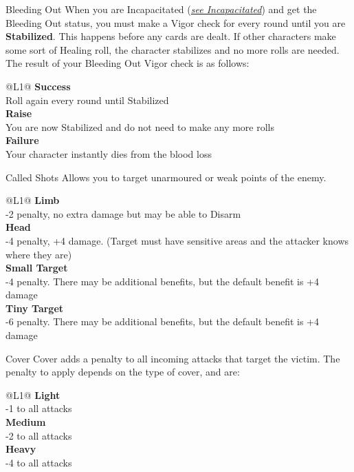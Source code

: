 \begin{genericsection}{Bleeding Out}
When you are Incapacitated (\textit{\hyperref[sec:rules-concepts-incapacitated]{see Incapacitated}}) and get the Bleeding Out status, you must make a Vigor check for every round until you are \textbf{Stabilized}. This happens before any cards are dealt. If other characters make some sort of Healing roll, the character stabilizes and no more rolls are needed. The result of your Bleeding Out Vigor check is as follows:
\begin{redtable}{\linewidth}{@{}L{1}@{}}
  \textbf{Success} \\
  Roll again every round until Stabilized\\
  \textbf{Raise} \\
  You are now Stabilized and do not need to make any more rolls\\
  \textbf{Failure} \\
  Your character instantly dies from the blood loss\\
\end{redtable}
\end{genericsection}

\begin{genericsection}{Called Shots}
Allows you to target unarmoured or weak points of the enemy.
  \begin{redtable}{\linewidth}{@{}L{1}@{}}
    \textbf{Limb}\\
    -2 penalty, no extra damage but may be able to Disarm\\
    \textbf{Head}\\
    -4 penalty, +4 damage. (Target must have sensitive areas and the attacker knows where they are)\\
    \textbf{Small Target}\\
    -4 penalty. There may be additional benefits, but the default benefit is +4 damage\\
    \textbf{Tiny Target}\\
    -6 penalty. There may be additional benefits, but the default benefit is +4 damage\\
  \end{redtable}
\end{genericsection}

\begin{genericsection}{Cover}
Cover adds a penalty to all incoming attacks that target the victim. The penalty to apply depends on the type of cover, and are:
\begin{redtable}{\linewidth}{@{}L{1}@{}}
  \textbf{Light} \\
  -1 to all attacks\\
  \textbf{Medium} \\
  -2 to all attacks\\
  \textbf{Heavy} \\
  -4 to all attacks\\
\end{redtable}
\end{genericsection}

